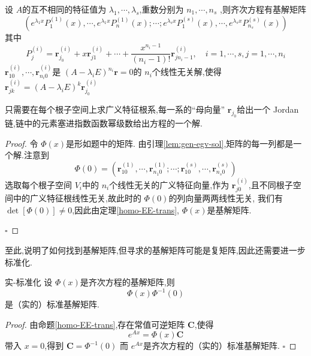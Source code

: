 \documentclass[lang=cn,12pt,color=green,fontset=none]{elegantbook}
\begin{document}
\begin{theorem}
    设 $ A $的互不相同的特征值为 $  \lambda _{1},\cdots , \lambda _{s} $,重数分别为 $ n_1,\cdots ,n_{s} $   ,则齐次方程有基解矩阵 $$
    \left( e^{ \lambda _{1}x}P_{1}^{\left( 1 \right) }\left( x \right),\cdots , e^{ \lambda _{1}x}P_{n}^{\left( 1 \right) }\left( x \right);\cdots ;e^{ \lambda _{s}x}P_{1}^{\left( s \right) }\left( x \right),\cdots , e^{ \lambda _{s}x}P _{n_{s}}^{\left( s \right)  }   \left( x \right) \right) 
    $$其中 $$
    P_{j}^{\left( i \right) } = \mathbf{r}_{j_0}^{\left( i \right) }+ x \mathbf{r}_{j1}^{\left( i \right) }+ \cdots +  \frac{x^{n_{i}-1} }{\left( n_{i}-1 \right)!  } \mathbf{r}_{j n_{i}-1}^{\left( i \right) }, \quad   i =  1,\cdots,s ,j= 1,\cdots,n _{i}  
    $$  $ \mathbf{r}_{10}^{\left( i \right) },\cdots , \mathbf{r}_{n_{i}0}^{\left( i \right) } $是 $ \left( A- \lambda _{i}E \right)  ^{n_{i}} \mathbf{r}=0$的 $ n_{i} $个线性无关解,使得 $ \mathbf{r}_{jk}^{\left( i \right) } = \left( A- \lambda _{i}E \right)^{k} \mathbf{r}_{j_{0}}^{\left( i \right) }  $    
\end{theorem}

\begin{note}
    只需要在每个根子空间上求广义特征根系,每一系的“母向量” $ \mathbf{r}_{j_0} $给出一个 Jordan链,链中的元素塞进指数函数幂级数给出方程的一个解. 
\end{note}
\begin{proof}
    令 $ \Phi \left( x \right)  $是形如题中的矩阵. 由引理\ref{lem:gen-egv-sol},矩阵的每一列都是一个解.注意到 $$
    \Phi \left( 0 \right) = \left( \mathbf{r}_{10}^{\left( 1 \right) },\cdots , \mathbf{r}_{n_1 0}^{\left( 1 \right) };\cdots ; \mathbf{r}_{10}^{\left( s \right) },\cdots ,\mathbf{r}_{n_{s}0}^{\left( s \right) } \right)  
    $$选取每个根子空间 $ V_{i} $中的 $ n_{i} $个线性无关的广义特征向量,作为 $ \mathbf{r}_{j 0}^{\left( i \right) } $,且不同根子空间中的广义特征根线性无关,故此时的 $ \Phi \left( 0 \right)  $的列向量两两线性无关,
    我们有 $ \det [\Phi \left( 0 \right) ]\neq 0 $,因此由定理\ref{homo-EE-trans}, $ \Phi \left( x \right)  $是基解矩阵.      

    \hfill $\square$
\end{proof}

至此,说明了如何找到基解矩阵,但寻求的基解矩阵可能是复矩阵,因此还需要进一步标准化.

\begin{theorem}{实-标准化}
    设 $ \Phi \left( x \right)  $是齐次方程的基解矩阵,则 $$
    \Phi \left( x \right)\Phi ^{-1} \left( 0 \right)  
    $$是（实的）标准基解矩阵. 
 \end{theorem}
 \begin{proof}
    由命题\ref{homo-EE-trans},存在常值可逆矩阵 $ \mathbf{C} $,使得 $$
    e^{Ax} = \Phi \left( x \right) \mathbf{C} 
    $$ 带入 $ x = 0 $,得到 $ \mathbf{C}= \Phi ^{-1} \left( 0 \right)  $  
    而 $ e^{Ax} $是齐次方程的（实的）标准基解矩阵.
    \hfill $\square$
 \end{proof}
\end{document}
